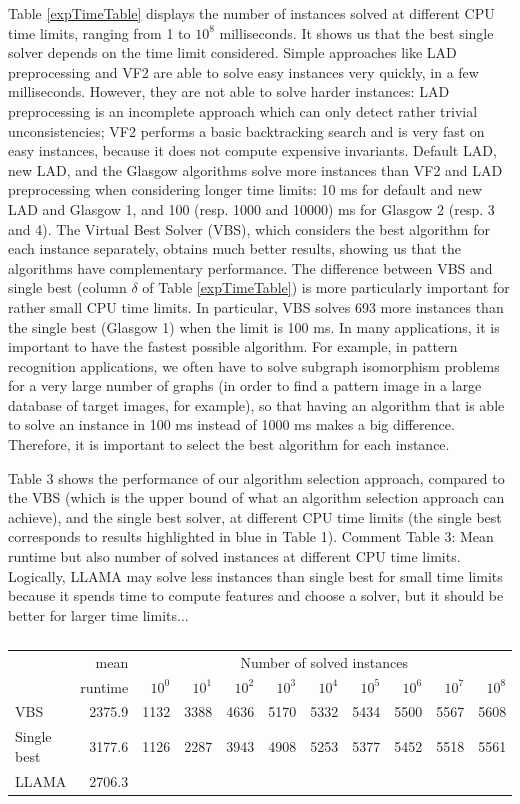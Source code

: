 \documentclass{llncs}
\begin{document}
Table \ref{expTimeTable} displays the number of instances solved at different CPU time limits, ranging
from 1 to $10^8$ milliseconds. It shows us that the best single solver depends on the time limit
considered. Simple approaches like LAD preprocessing and VF2 are able to solve easy instances very
quickly, in a few milliseconds. However, they are not able to solve harder instances: LAD
preprocessing is an incomplete approach which can only detect rather trivial unconsistencies; VF2
performs a basic backtracking search and is very fast on easy instances, because it does not compute
expensive invariants. Default LAD, new LAD, and the Glasgow algorithms solve more instances than VF2
and LAD preprocessing when considering longer time limits: 10 ms for default and new LAD and Glasgow
1, and 100 (resp. 1000 and 10000) ms for Glasgow 2 (resp. 3 and 4). The Virtual Best Solver (VBS),
which considers the best algorithm for each instance separately, obtains much better results,
showing us that the algorithms have complementary performance. The difference between VBS and single
best (column $\delta$ of Table \ref{expTimeTable}) is more particularly important for rather small CPU
time limits. In particular, VBS solves 693 more instances than the single best (Glasgow 1) when the
limit is 100 ms. In many applications, it is important to have the fastest possible algorithm. For
example, in pattern recognition applications, we often have to solve subgraph isomorphism problems
for a very large number of graphs (in order to find a pattern image in a large database of target
images, for example), so that having an algorithm that is able to solve an instance in 100 ms
instead of 1000 ms makes a big difference. Therefore, it is important to select the best algorithm
for each instance.

Table 3 shows the performance of our algorithm selection approach, compared to the VBS (which is the
upper bound of what an algorithm selection approach can achieve), and the single best solver, at
different CPU time limits (the single best corresponds to results highlighted in blue in Table 1).
Comment Table 3: Mean runtime but also number of solved instances at different CPU time limits.
Logically, LLAMA may solve less instances than single best for small time limits because it spends
time to compute features and choose a solver, but it should be better for larger time limits...

\begin{table}
\begin{tabular}{|l|r|rrrrrrrrr|}
&mean & \multicolumn{9}{c|}{Number of solved instances}\\
&runtime & $10^0$ &  $10^1$ &  $10^2$ &  $10^3$ &  $10^4$ &  $10^5$ &  $10^6$ &  $10^7$ &  $10^8$\\\hline
VBS & 2375.9 & 1132 & 3388 & 4636 & 5170 & 5332 & 5434 & 5500 & 5567 & 5608\\\hline
Single best & 3177.6 & 1126 & 2287 & 3943 & 4908 & 5253 & 5377 & 5452 & 5518 & 5561\\\hline
LLAMA & 2706.3\\\hline
\end{tabular}
\caption{}
\end{table}
\end{document}
